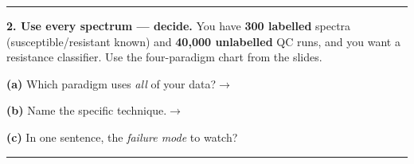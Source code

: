 \documentclass[11pt]{article}
\newif\ifsolution
\newcommand{\blk}[1]{\underline{\hspace{#1}}}
\newcommand{\rb}[2]{\ifsolution\textbf{#1}\else\blk{#2}\fi}
\newcommand{\keybox}[1]{\ifsolution\par\vspace{2pt}%
  \fbox{\parbox{0.965\textwidth}{\small\textbf{Answer.}\; #1}}\par\fi}
\newcommand{\work}[1]{\ifsolution\else\vspace{#1}\fi}
\begin{document}
\work{0.4cm}

\keybox{(a) \textbf{Garbage / a non-physical spectrum.} Picture A is a plain autoencoder: its
latent is scattered islands with big empty \textbf{gaps}, so a random sample lands where the
decoder was never trained. (b) \textbf{A plausible spectrum} --- Picture B is one smooth,
gap-free cloud, so \emph{every} point decodes to something realistic. (c) \textbf{Picture B is
the VAE}, and it is the latent you sample to generate (or interpolate): only a gap-free latent
is safe to sample. (B is also the map you would trust to flag a \emph{novel} contaminant --- a
genuinely new spectrum lands outside the tidy cloud, easy to flag.)}

\vspace{2pt}\hrule\vspace{5pt}

\textbf{2. Use every spectrum --- decide.}\; {\small You have \textbf{300 labelled} spectra
(susceptible/resistant known) and \textbf{40{,}000 unlabelled} QC runs, and you want a resistance
classifier. Use the four-paradigm chart from the slides.}

\vspace{4pt}
\textbf{(a)} Which paradigm uses \emph{all} of your data?\hfill $\rightarrow$\;\rb{semi-supervised}{4.6cm}

\vspace{3pt}
\textbf{(b)} Name the specific technique.\hfill $\rightarrow$\;\rb{pseudo-labelling}{4.6cm}

\vspace{3pt}
\textbf{(c)} In one sentence, the \emph{failure mode} to watch?

\work{1.0cm}
\ifsolution\else\blk{\linewidth}\fi

\keybox{(a) \textbf{Semi-supervised} --- a few labels plus many unlabelled examples, so use both
(the middle path). (b) \textbf{Pseudo-labelling}: train a first model on the 300 labelled,
predict on the 40{,}000 unlabelled, keep only the \emph{confident} predictions as pseudo-labels,
and retrain on the combined set (optionally repeat). (c) \textbf{Confident-but-wrong pseudo-labels
reinforce the model's own mistakes} --- a weak early model can poison the pool, so the confidence
filter matters. (Pure supervised would throw away 40{,}000 runs; pure unsupervised would ignore
the 300 labels you paid for.)}

\vspace{2pt}\hrule\vspace{5pt}
\end{document}
